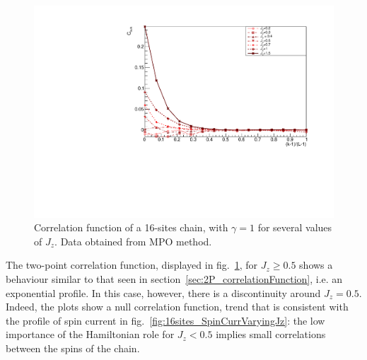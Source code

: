 



\begin{figure}[H]
    \centering
    \includegraphics[scale=0.75]{Figures/16sites/16sites_CFBulkCONNvsJz.pdf}
    \captionsetup{width=1.\linewidth}
    \caption{Correlation function of a 16-sites chain, with $\gamma = 1$ for several values of $J_z$. Data obtained from MPO method.}
    \label{fig:16sites_CFBulkCONNvsJz}
\end{figure}

The two-point correlation function, displayed in fig.~\ref{fig:16sites_CFBulkCONNvsJz}, for $J_z \geq 0.5$ shows a behaviour similar to that seen in section~\ref{sec:2P_correlationFunction}, i.e. an exponential profile. In this case, however, there is a discontinuity around $J_z = 0.5$. Indeed, the plots show a null correlation function, trend that is consistent with the profile of spin current in fig.~\ref{fig:16sites_SpinCurrVaryingJz}: the low importance of the Hamiltonian role for $J_z < 0.5$ implies small correlations between the spins of the chain.

